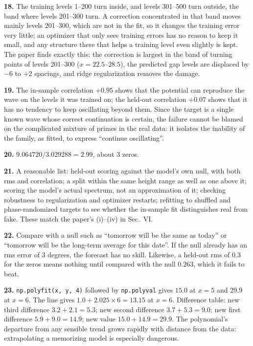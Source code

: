 \textbf{18.} The training levels 1--200 turn inside, and levels 301--500 turn outside, the band where levels 201--300 turn. A correction concentrated in that band moves mainly levels 201--300, which are not in the fit, so it changes the training error very little; an optimizer that only sees training errors has no reason to keep it small, and any structure there that helps a training level even slightly is kept. The paper finds exactly this: the correction is largest in the band of turning points of levels 201--300 ($x = 22.5$--$28.5$), the predicted gap levels are displaced by $-6$ to $+2$ spacings, and ridge regularization removes the damage.

\textbf{19.} The in-sample correlation $+0.95$ shows that the potential can reproduce the wave on the levels it was trained on; the held-out correlation $+0.07$ shows that it has no tendency to keep oscillating beyond them. Since the target is a single known wave whose correct continuation is certain, the failure cannot be blamed on the complicated mixture of primes in the real data: it isolates the inability of the family, as fitted, to express ``continue oscillating''.

\textbf{20.} $9.064720/3.029288 = 2.99$, about 3 zeros.

\textbf{21.} A reasonable list: held-out scoring against the model's own null, with both rms and correlation; a split within the same height range as well as one above it; scoring the model's actual spectrum, not an approximation of it; checking robustness to regularization and optimizer restarts; refitting to shuffled and phase-randomized targets to see whether the in-sample fit distinguishes real from fake. These match the paper's (i)--(iv) in Sec.~VI.

\textbf{22.} Compare with a null such as ``tomorrow will be the same as today'' or ``tomorrow will be the long-term average for this date''. If the null already has an rms error of 3 degrees, the forecast has no skill. Likewise, a held-out rms of $0.3$ for the zeros means nothing until compared with the null $0.263$, which it fails to beat.

\textbf{23.} \texttt{np.polyfit(x, y, 4)} followed by \texttt{np.polyval} gives $15.0$ at $x=5$ and $29.9$ at $x=6$. The line gives $1.0 + 2.025\times 6 = 13.15$ at $x=6$. Difference table: new third difference $3.2 + 2.1 = 5.3$; new second difference $3.7 + 5.3 = 9.0$; new first difference $5.9 + 9.0 = 14.9$; new value $15.0 + 14.9 = 29.9$. The polynomial's departure from any sensible trend grows rapidly with distance from the data: extrapolating a memorizing model is especially dangerous.

